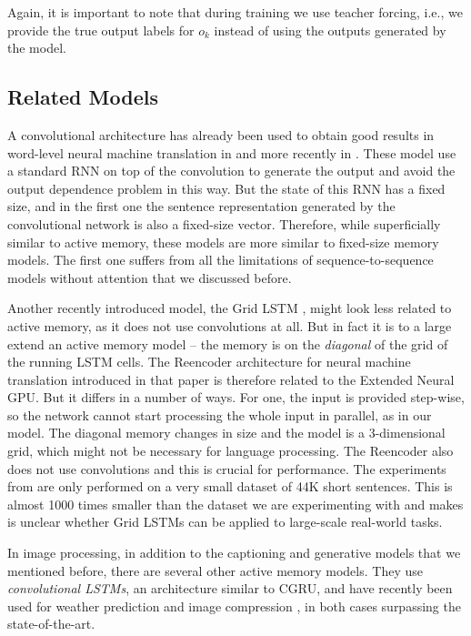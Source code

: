 \documentclass{article}
\begin{document}
Again, it is important to note that during training we use
teacher forcing, i.e., we provide the true output labels
for $o_k$ instead of using the outputs generated by the model.


\subsection{Related Models}

A convolutional architecture has already been used to obtain good results in
word-level neural machine translation in \cite{KalchbrennerB13} and more
recently in \cite{MengLWLJL15}.
These model use a standard RNN on top of the convolution to generate the output
and avoid the output dependence problem in this way. But the state of this RNN
has a fixed size, and in the first one the sentence representation generated by
the convolutional network is also a fixed-size vector. Therefore, while superficially
similar to active memory, these models are more similar to fixed-size memory models.
The first one suffers from all the limitations of sequence-to-sequence models
without attention \cite{sutskever14,cho2014learning} that we discussed before.

Another recently introduced model, the Grid LSTM \cite{gridLSTM15},
might look less related to active memory, as it does not use convolutions
at all. But in fact it is to a large extend an active memory model -- the memory
is on the \emph{diagonal} of the grid of the running LSTM cells.
The Reencoder architecture for neural machine translation introduced in that
paper is therefore related to the Extended Neural GPU. But it differs in a number
of ways. For one, the input is provided step-wise, so the network cannot start
processing the whole input in parallel, as in our model. The diagonal memory
changes in size and the model is a 3-dimensional grid, which might not be
necessary for language processing. The Reencoder also
does not use convolutions and this is crucial for performance. The experiments
from \cite{gridLSTM15} are only performed on a very small dataset
of 44K short sentences. This is almost 1000 times smaller than the dataset
we are experimenting with and makes is unclear whether Grid LSTMs can be applied
to large-scale real-world tasks.

In image processing, in addition to the captioning \cite{xuetal2015}
and generative models \cite{one_shot, conceptual_compression} that we
mentioned before, there are several other active memory models.
They use \emph{convolutional LSTMs}, an architecture similar to CGRU,
and  have recently been used for weather prediction
\cite{convLSTMweather} and image compression \cite{convLSTMcompress},
in both cases surpassing the state-of-the-art.
\end{document}
